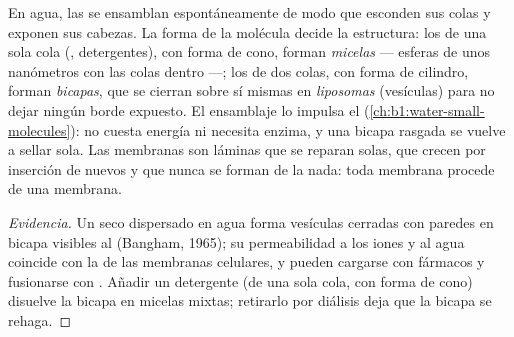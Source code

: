 \begin{proposition}[Autoensamblaje]\label{prop:b1:lipids:selfassembly}
En agua, las  se ensamblan espontáneamente de modo que
esconden sus colas y exponen sus cabezas. La forma de la molécula decide la
estructura: los  de una sola cola (, detergentes), con
forma de cono, forman \emph{micelas} --- esferas de unos nanómetros con las
colas dentro ---; los  de dos colas, con forma de cilindro,
forman \emph{bicapas}, que se cierran sobre sí mismas en \emph{liposomas}
(vesículas) para no dejar ningún borde expuesto. El ensamblaje lo impulsa el
 (\cref{ch:b1:water-small-molecules}): no cuesta energía ni
necesita enzima, y una bicapa rasgada se vuelve a sellar sola. Las membranas
son láminas que se reparan solas, que crecen por inserción de  nuevos
y que nunca se forman de la nada: toda membrana procede de una membrana.
\end{proposition}
\begin{proof}[Evidencia]
Un  seco dispersado en agua forma vesículas cerradas con paredes
en bicapa visibles al  (Bangham, 1965); su
permeabilidad a los iones y al agua coincide con la de las membranas
celulares, y pueden cargarse con fármacos y fusionarse con . Añadir
un detergente (de una sola cola, con forma de cono) disuelve la bicapa en
micelas mixtas; retirarlo por diálisis deja que la bicapa se rehaga.
\end{proof}

